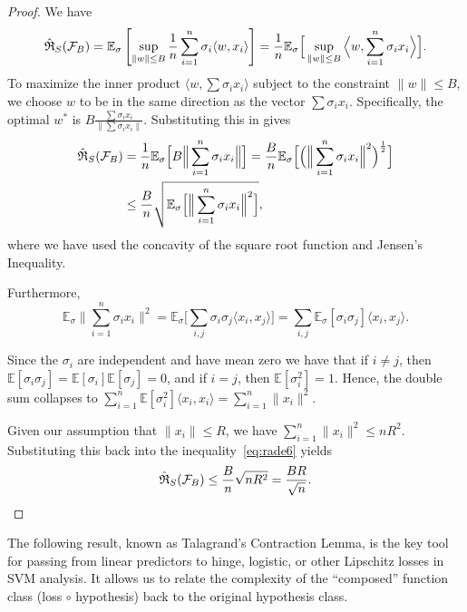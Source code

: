\begin{proof}
We have
$$\hat{\mathfrak{R}}_S(\mathcal{F}_B) = \mathbb{E}_{\sigma} \left[ \sup_{\|w\| \leq B} \frac{1}{n} \sum_{i=1}^n \sigma_i \langle w, x_i \rangle \right]  = \frac{1}{n} \mathbb{E}_{\sigma} \Big[ \sup_{\|w\| \leq B} \Big\langle w, \sum_{i=1}^n \sigma_i x_i \Big\rangle \Big].$$
To maximize the inner product $\langle w, \sum \sigma_i x_i \rangle$ subject to the constraint $\|w\| \leq B$, we choose $w$ to be in the same direction as the vector $\sum \sigma_i x_i$.
Specifically, the optimal $w^*$ is $B \frac{\sum \sigma_i x_i}{\|\sum \sigma_i x_i\|}$. Substituting this in gives
\begin{align}\label{eq:rade6}
\begin{split}
\hat{\mathfrak{R}}_S(\mathcal{F}_B) & = \frac{1}{n} \mathbb{E}_{\sigma} \Big[ B \Big\| \sum_{i=1}^n \sigma_i x_i \Big\| \Big] = \frac{B}{n} \mathbb{E}_{\sigma} \Big[ \Big( \Big\| \sum_{i=1}^n \sigma_i x_i \Big\|^2 \Big)^{\frac{1}{2}} \Big] \\
& \leq \frac{B}{n} \sqrt{ \mathbb{E}_{\sigma} \Big[ \Big\| \sum_{i=1}^n \sigma_i x_i \Big\|^2 \Big] },
\end{split}
\end{align}
where we have used the concavity of the square root function and Jensen's Inequality.

Furthermore, 
\begin{equation}
\mathbb{E}_{\sigma} \Big\| \sum_{i=1}^n \sigma_i x_i \Big\|^2 =
\mathbb{E}_{\sigma} \Big[ \sum_{i,j} \sigma_i \sigma_j \langle x_i, x_j \rangle \Big] = \sum_{i,j} \mathbb{E}_{\sigma}[\sigma_i \sigma_j] \langle x_i, x_j \rangle.
\end{equation}

Since the $\sigma_i$ are independent and have mean zero we have that if $i \neq j$, then $\mathbb{E}[\sigma_i \sigma_j] = \mathbb{E}[\sigma_i]\mathbb{E}[\sigma_j] = 0$, and  if $i = j$, then $\mathbb{E}[\sigma_i^2] = 1$. Hence,  the double sum collapses to
$\sum_{i=1}^n \mathbb{E}[\sigma_i^2] \langle x_i, x_i \rangle = \sum_{i=1}^n \|x_i\|^2$.

Given our assumption that $\|x_i\| \leq R$, we have $\sum_{i=1}^n \|x_i\|^2 \leq nR^2$. Substituting this back into the inequality~\eqref{eq:rade6} yields
$$\hat{\mathfrak{R}}_S(\mathcal{F}_B) \leq \frac{B}{n} \sqrt{nR^2} =  \frac{BR}{\sqrt{n}}.$$

\end{proof}



The following result, known as Talagrand's Contraction Lemma, 
is the key tool for passing from linear predictors to hinge, logistic, or other Lipschitz losses in SVM analysis. It
allows us to relate the complexity of the ``composed'' function class (loss $\circ$ hypothesis) back to the original hypothesis class.

